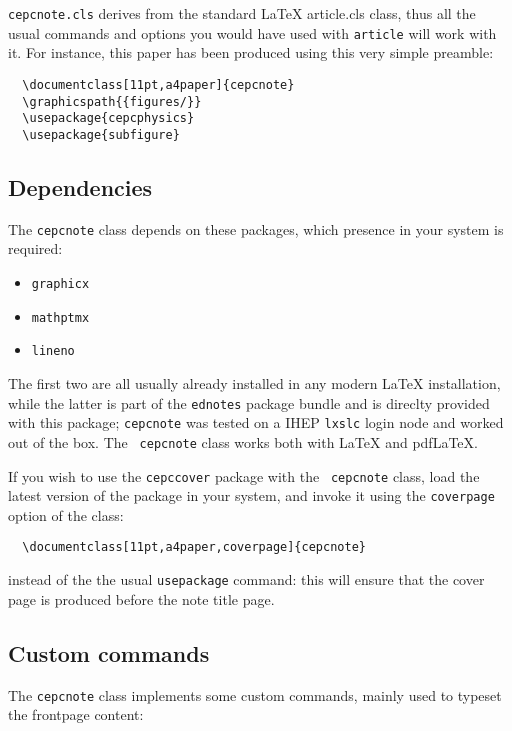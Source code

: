 \documentclass[11pt,a4paper]{cepcnote}
\begin{document}
{\tt cepcnote.cls} derives from the standard \LaTeX{} {article.cls}
class, thus all the usual commands and options you would have used
with {\tt article} will work with it. For instance, this paper has
been produced using this very simple preamble:

\begin{verbatim}
  \documentclass[11pt,a4paper]{cepcnote}
  \graphicspath{{figures/}}
  \usepackage{cepcphysics}
  \usepackage{subfigure}
\end{verbatim}

\subsection{Dependencies}

The {\tt cepcnote} class depends on these packages, which presence in
your system is required:
\begin{itemize}
  \item {\tt graphicx}
  \item {\tt mathptmx}
  \item {\tt lineno}
\end{itemize}
The first two are all usually already installed in any modern \LaTeX{}
installation, while the latter is part of the {\tt ednotes} package
bundle and is direclty provided with this package; {\tt cepcnote} was
tested on a IHEP {\tt lxslc} login node and worked out of the box. The {\tt
  cepcnote} class works both with \LaTeX{} and pdf\LaTeX{}.

If you wish to use the {\tt cepccover} package with the {\tt
  cepcnote} class, load the latest version of the package in your
system, and invoke it using the {\tt coverpage} option of the class:
\begin{verbatim}
  \documentclass[11pt,a4paper,coverpage]{cepcnote}
\end{verbatim}
instead of the the usual {\tt usepackage} command: this will ensure
that the cover page is produced before the note title page.

\subsection{Custom commands}

The {\tt cepcnote} class implements some custom commands, mainly
used to typeset the frontpage content:
\end{document}

